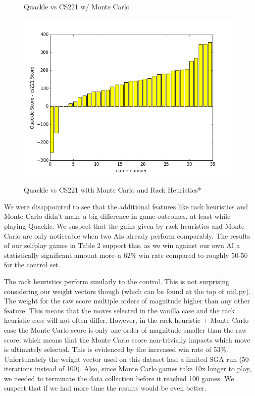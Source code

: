 \documentclass[12pt]{article}
\begin{document}
\begin{figure}[h!]
  \caption{\footnotesize{Quackle vs CS221 w/ Monte Carlo}}
  \endminipage
      \centering
  \includegraphics[scale=0.39]{../images/quacklegame_MC-RH_35}\\
   \caption{\footnotesize{Quackle vs CS221 with Monte Carlo and Rack
       Heuristics*}}
  \endminipage{}
\end{figure}

We were disappointed to see that the additional features like rack
heuristics and Monte Carlo didn't make a big difference in game
outcomes, at least while playing Quackle. We suspect that the gains
given by rack heuristics and Monte Carlo are only noticeable when two
AIs already perform comparably. The results of our selfplay games in
Table 2 support this, as we win against our own AI a statistically
significant amount more--a 62\% win rate compared to roughly 50-50 for
the control set.  

The rack heuristics perform similarly to the control. This is not
surprising considering our weight vectors though (which can be found
at the top of util.py). The weight for the raw score multiple orders
of magnitude higher than any other feature. This means that the moves
selected in the vanilla case and the rack heuristic case will not
often differ. However, in the rack heuristic + Monte Carlo case the
Monte Carlo score is only one order of magnitude smaller than the raw
score, which means that the Monte Carlo score non-trivially impacts
which move is ultimately selected. This is evidenced by the increased
win rate of 53\%. Unfortunately the weight vector used on this dataset
had a limited SGA run (50 iterations instead of 100). Also, since
Monte Carlo games take 10x longer to play, we needed to terminate the
data collection before it reached 100 games. We suspect that if we had
more time the results would be even better.
\end{document}

